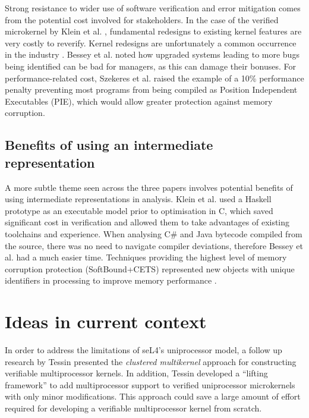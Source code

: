 \documentclass[11pt]{article}
\begin{document}
Strong resistance to wider use of software verification and error mitigation comes from the potential cost involved for stakeholders. In the case of the verified microkernel by Klein et al. \cite[5.3]{klein2009sel4}, fundamental redesigns to existing kernel features are very costly to reverify. Kernel redesigns are unfortunately a common occurrence in the industry \cite{israeli2010linux}. Bessey et al. \cite[p. 73]{bessey2010few} noted how upgraded systems leading to more bugs being identified can be bad for managers, as this can damage their bonuses. For performance-related cost, Szekeres et al. \cite[V-A]{szekeres2013sok} raised the example of a 10\% performance penalty preventing most programs from being compiled as Position Independent Executables (PIE), which would allow greater protection against memory corruption.

\subsection{Benefits of using an intermediate representation}

A more subtle theme seen across the three papers involves potential benefits of using intermediate representations in analysis. Klein et al. \cite[2.2, 5.2]{klein2009sel4} used a Haskell prototype as an executable model prior to optimisation in C, which saved significant cost in verification and allowed them to take advantages of existing toolchains and experience. When analysing C\# and Java bytecode compiled from the source, there was no need to navigate compiler deviations, therefore Bessey et al. \cite[p. 72]{bessey2010few} had a much easier time. Techniques providing the highest level of memory corruption protection (SoftBound+CETS) represented new objects with unique identifiers in processing to improve memory performance \cite[VI-C]{szekeres2013sok}. 

\section{Ideas in current context}

In order to address the limitations of seL4's uniprocessor model, a follow up research by Tessin \cite{von2012clustered} presented the \emph{clustered multikernel} approach for constructing verifiable multiprocessor kernels. In addition, Tessin developed a ``lifting framework'' to add multiprocessor support to verified uniprocessor microkernels with only minor modifications. This approach could save a large amount of effort required for developing a verifiable multiprocessor kernel from scratch.
\end{document}
